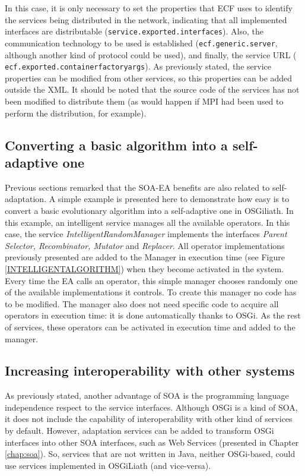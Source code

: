 In this case, it is only necessary to set the properties that ECF uses to identify the services being distributed in the network, indicating that all implemented interfaces are distributable (\texttt{ser\-vi\-ce\-.ex\-por\-ted\-.in\-ter\-fa\-ces}). Also, the communication technology to be used is established (\texttt{ecf\-.ge\-ne\-ric\-.ser\-ver}, although another kind of protocol could be used), and finally, the service URL (\texttt{ ecf\-.ex\-por\-ted\-.con\-tai\-ner\-fac\-to\-ry\-args}). As previously stated, the service properties can be modified from other services, so this properties can be added outside the XML. It should be noted that the source code of the services has not been modified to distribute them (as would happen if MPI had been used to perform the distribution, for example).




\subsection{Converting a basic algorithm into a self-adaptive one}

Previous sections remarked that the SOA-EA benefits are also related to self-adaptation. A simple example is presented here to demonstrate how easy is to convert a basic evolutionary algorithm into a self-adaptive one in OSGiliath. In this example, an intelligent service manages all the available operators. In this case, the service {\em IntelligentRandomManager} implements the interfaces {\em Parent Selector, Recombinator, Mutator} and {\em Replacer}. All operator implementations previously presented are added to the Manager in execution time (see Figure \ref{INTELLIGENTALGORITHM}) when they become activated in the system. Every time the EA calls an operator, this simple manager chooses randomly one of the available implementations it controls. To create this manager no code has to be modified. The manager also does not need specific code to acquire all operators in execution time: it is done automatically thanks to OSGi. As the rest of services, these operators can be activated in execution time and added to the manager. 



\subsection{Increasing interoperability with other systems}

As previously stated, another advantage of SOA is the programming language independence respect to the service interfaces. Although OSGi is a kind of SOA, it does not include  the capability of interoperability with other kind of services by default. However, adaptation services can be added to transform OSGi interfaces into other SOA interfaces, such as Web Services (presented in Chapter \ref{chap:soa}). So, services that are not written in Java, neither OSGi-based, could use services implemented in OSGiLiath (and vice-versa).

